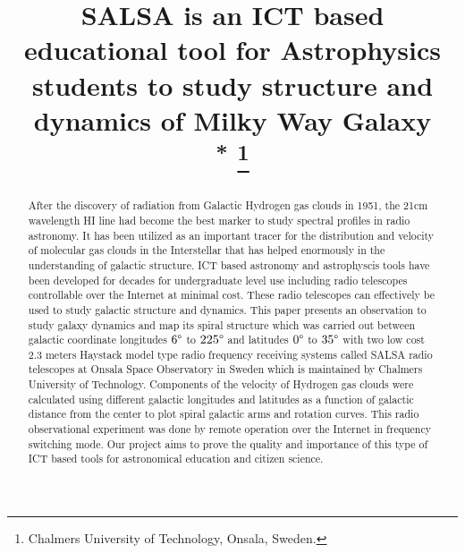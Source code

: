 \documentclass[conference]{IEEEtran}
\begin{document}
\title{SALSA is an ICT based educational tool for Astrophysics students to study structure and dynamics of Milky Way Galaxy\\
{\footnotesize \textsuperscript{*}}
\thanks{Chalmers University of Technology, Onsala, Sweden.}
}

\author{
\and
{}
}

\maketitle

\begin{abstract}
After the discovery of radiation from Galactic Hydrogen gas clouds in 1951, the 21cm wavelength HI line had become the best marker to study spectral profiles in radio astronomy. It has been utilized as an important tracer for the distribution and velocity of molecular gas clouds in the Interstellar that has helped enormously in the understanding of galactic structure. ICT based astronomy and astrophyscis tools have been developed for decades for undergraduate level use including radio telescopes controllable over the Internet at minimal cost. These radio telescopes can effectively be used to study galactic structure and dynamics. This paper presents an observation to study galaxy dynamics and map its spiral structure which was carried out between galactic coordinate longitudes $6\degree$ to $225\degree$ and latitudes $0\degree$ to $35\degree$ with two low cost $2.3$ meters Haystack model type radio frequency receiving systems called SALSA radio telescopes at Onsala Space Observatory in Sweden which is maintained by Chalmers University of Technology. Components of the velocity of Hydrogen gas clouds were calculated using different galactic longitudes and latitudes as a function of galactic distance from the center to plot spiral galactic arms and rotation curves. This radio observational experiment was done by remote operation over the Internet in frequency switching mode. Our project aims to prove the quality and importance of this type of ICT based tools for astronomical education and citizen science.
\end{abstract}
\end{document}
